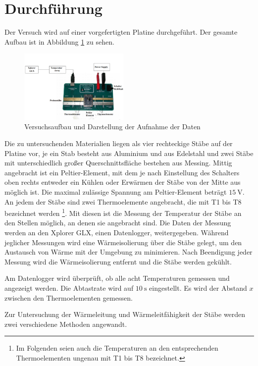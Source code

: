 \section{Durchführung}
\label{sec:Durchführung}
Der Versuch wird auf einer vorgefertigten Platine durchgeführt. Der gesamte Aufbau
ist in Abbildung \ref{fig:aufbau} zu sehen.

\begin{figure}
  \centering
  \includegraphics[width=150pt]{data/aufbau.png}
  \caption{Versuchsaufbau und Darstellung der Aufnahme der Daten \cite{Versuchsanleitung}}
  \label{fig:aufbau}
\end{figure}

Die zu untersuchenden Materialien liegen als vier rechteckige Stäbe auf der Platine vor,
je ein Stab besteht aus Aluminium und aus Edelstahl und zwei Stäbe mit unterschiedlich
großer Querschnittsfläche bestehen aus Messing. Mittig angebracht ist ein Peltier-Element,
mit dem je nach Einstellung des Schalters oben rechts entweder ein Kühlen oder
Erwärmen der Stäbe von der Mitte aus möglich ist. Die maximal zulässige Spannung am Peltier-Element beträgt $\SI{15}{\volt}$.
An jedem der Stäbe sind zwei Thermoelemente angebracht, die mit T1 bis T8 bezeichnet werden
\footnote{Im Folgenden seien auch die Temperaturen an den entsprechenden Thermoelementen ungenau mit T1 bis T8 bezeichnet.}.
Mit diesen ist die Messung der Temperatur der Stäbe an den Stellen möglich,
an denen sie angebracht sind. Die Daten der Messung werden an den Xplorer GLX, einen Datenlogger, weitergegeben.
Während jeglicher Messungen wird eine Wärmeisolierung über die Stäbe gelegt, um
den Austausch von Wärme mit der Umgebung zu minimieren. Nach Beendigung jeder Messung
wird die Wärmeisolierung entfernt und die Stäbe werden gekühlt.

Am Datenlogger wird überprüft, ob alle acht Temperaturen gemessen und angezeigt werden.
Die Abtastrate wird auf $\SI{10}{\second}$ eingestellt.
Es wird der Abstand $x$ zwischen den Thermoelementen gemessen.

Zur Untersuchung der Wärmeleitung und Wärmeleitfähigkeit der Stäbe werden zwei
verschiedene Methoden angewandt.

